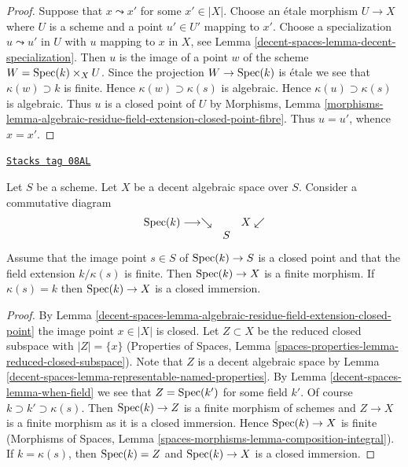 \begin{proof}
Suppose that $x \leadsto x'$ for some $x' \in |X|$. Choose an
\'etale morphism $U \to X$ where $U$ is a scheme and a point $u' \in U'$
mapping to $x'$. Choose a specialization $u \leadsto u'$ in $U$ with $u$
mapping to $x$ in $X$, see Lemma \ref{decent-spaces-lemma-decent-specialization}.
Then $u$ is the image of a point $w$ of the scheme
$W = \operatorname{Spec}(k) \times_X U$. Since the projection $W \to \operatorname{Spec}(k)$ is \'etale
we see that $\kappa(w) \supset k$ is finite. Hence
$\kappa(w) \supset \kappa(s)$ is algebraic. Hence $\kappa(u) \supset \kappa(s)$
is algebraic. Thus $u$ is a closed point of $U$ by
Morphisms, Lemma
\ref{morphisms-lemma-algebraic-residue-field-extension-closed-point-fibre}.
Thus $u = u'$, whence $x = x'$.
\end{proof}

\begin{lemma}
\label{decent-spaces-lemma-finite-residue-field-extension-finite}
\href{https://stacks.math.columbia.edu/tag/08AL}{\texttt{Stacks tag 08AL}}

Let $S$ be a scheme. Let $X$ be a decent algebraic space over $S$.
Consider a commutative diagram
$$
\begin{array}{ccc}\operatorname{Spec}(k) \longrightarrow\searrow &  & X \swarrow \\  & S & \end{array}
$$
Assume that the image point $s \in S$ of $\operatorname{Spec}(k) \to S$ is
a closed point and that the field extension $k/\kappa(s)$ is finite.
Then $\operatorname{Spec}(k) \to X$ is a finite morphism. If $\kappa(s) = k$
then $\operatorname{Spec}(k) \to X$ is a closed immersion.
\end{lemma}

\begin{proof}
By Lemma \ref{decent-spaces-lemma-algebraic-residue-field-extension-closed-point}
the image point $x \in |X|$ is closed. Let $Z \subset X$ be the
reduced closed subspace with $|Z| = \{x\}$ (Properties of Spaces,
Lemma \ref{spaces-properties-lemma-reduced-closed-subspace}).
Note that $Z$ is a decent algebraic space by
Lemma \ref{decent-spaces-lemma-representable-named-properties}.
By Lemma \ref{decent-spaces-lemma-when-field} we see that $Z = \operatorname{Spec}(k')$
for some field $k'$. Of course $k \supset k' \supset \kappa(s)$.
Then $\operatorname{Spec}(k) \to Z$ is a finite morphism of schemes
and $Z \to X$ is a finite morphism as it is a closed immersion.
Hence $\operatorname{Spec}(k) \to X$ is finite (Morphisms of Spaces, Lemma
\ref{spaces-morphisms-lemma-composition-integral}).
If $k = \kappa(s)$, then $\operatorname{Spec}(k) = Z$ and $\operatorname{Spec}(k) \to X$
is a closed immersion.
\end{proof}

